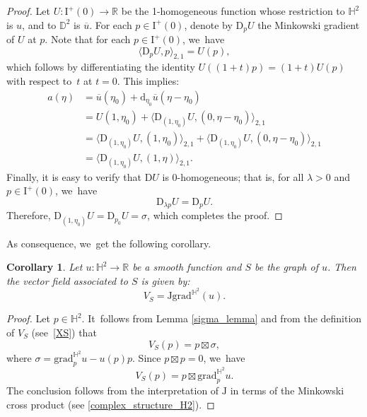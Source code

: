 \documentclass[10pt]{amsart}
\theoremstyle{plain}
\newtheorem{cor}{Corollary}[section]
\theoremstyle{definition}
\newcommand{\I}{\mathrm{I}}
\newcommand{\grad}{\mathrm{grad}^{\mathbb{H}^2}}
\newcommand{\J}{\mathrm{J}}
\begin{document}
\begin{proof}
Let \(U: \I^+(0) \to \mathbb{R} \) be the 1-homogeneous function whose restriction to \(\mathbb{H}^2 \) is \(u \), and to \(\mathbb{D}^2 \) is \(\overline{u} \).
For each \(p \in \I^{+}(0) \), denote by \(\mathrm{D}_p U \) the Minkowski gradient of \(U \) at \(p \). Note that for each \(p \in \I^{+}(0) \), we~have
\[
\langle \mathrm{D}_p U, p \rangle_{2,1} = U(p),
\]
which follows by differentiating the identity \(U((1+t)p) = (1+t)U(p) \) with respect to~\(t \) at \(t=0 \).
This implies:
\begin{align*}
a(\eta) &= \overline{u}(\eta_0) + \mathrm{d}_{\eta_0} \overline{u}(\eta - \eta_0) \\
&= U(1, \eta_0) + \langle \mathrm{D}_{(1, \eta_0)} U, (0, \eta - \eta_0) \rangle_{2,1} \\
&= \langle \mathrm{D}_{(1, \eta_0)} U, (1, \eta_0) \rangle_{2,1} + \langle \mathrm{D}_{(1, \eta_0)} U, (0, \eta - \eta_0) \rangle_{2,1} \\
&= \langle \mathrm{D}_{(1, \eta_0)} U, (1, \eta) \rangle_{2,1}.
\end{align*}
Finally, it is easy to verify that \(\mathrm{D}U \) is 0-homogeneous; that is, for all \(\lambda > 0 \) and \(p \in \I^{+}(0) \), we~have
\[
\mathrm{D}_{\lambda p} U = \mathrm{D}_p U.
\]
Therefore, \(\mathrm{D}_{(1, \eta_0)} U = \mathrm{D}_{p_0} U = \sigma \), which completes the proof.
\end{proof}
As consequence, we~get the following corollary.
\begin{cor}\label{cor_formule_XS}
Let $u:\mathbb{H}^2\to\mathbb{R}$ be a smooth function and $S$ be the graph of $u$. Then the vector field associated to $S$ is given by:
\[
V_S=\J\grad(u).
\]
\end{cor}
\begin{proof}
Let $p\in\mathbb{H}^2$. It~follows from Lemma \ref{sigma_lemma} and from the definition of $V_S$ (see~\eqref{XS}) that
\[
V_S(p)=p\boxtimes\sigma,
\]
where
$\sigma=\grad_{p}u-u(p)p$. Since $p\boxtimes p=0$, we~have
\[
V_S(p)=p\boxtimes\grad_{p}u.
\]The conclusion follows from the interpretation of $\J$ in terms of the Minkowski cross product (see \eqref{complex_structure_H2}).
\end{proof}
\end{document}

